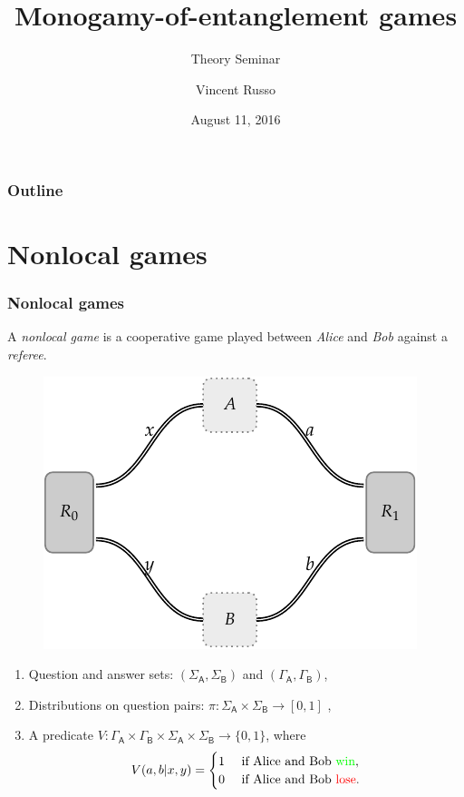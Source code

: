 \documentclass{beamer}
\title{Monogamy-of-entanglement games}
\subtitle{Theory Seminar}
\author[V. Russo]{Vincent Russo}
\institute[UWaterloo]{University of Waterloo}
\date{August 11, 2016}
\def \GammaA{\Gamma_{\reg{A}}}
\def \GammaB{\Gamma_{\reg{B}}}
\def \SigmaA{\Sigma_{\reg{A}}}
\def \SigmaB{\Sigma_{\reg{B}}}
\newcommand{\reg}[1]{\mathsf{#1}}
\begin{document}
  {%
    \frame{\titlepage}
  }

  \beamertemplatenavigationsymbolsempty

  \begin{frame}
    \frametitle{Outline}
    \tableofcontents%
  \end{frame}

  \section{Nonlocal games}

\begin{frame}
	\frametitle{Nonlocal games}
	A \emph{nonlocal game} is a cooperative game played between \emph{Alice} and \emph{Bob} against a \emph{referee}. 
	\begin{figure}[!htpb] \label{fig:nonlocal-game}
	\begin{center}
		\includegraphics[scale=0.8]{figures/two_player_game.pdf}
	\end{center}
\end{figure}
	\begin{enumerate}
		\item Question and answer sets: $(\SigmaA, \SigmaB)$ and $(\GammaA, \GammaB)$,
		\item Distributions on question pairs: $\pi: \SigmaA \times \SigmaB \rightarrow [0,1]$ ,
		\item A predicate $V : \GammaA \times \GammaB \times \SigmaA \times \SigmaB \rightarrow \{0,1\}$, where 
\[
 V(a,b|x,y) =
  \begin{cases} 
      \hfill 1 \hfill & \text{ if Alice and Bob \textcolor{green}{win}}, \\
      \hfill 0 \hfill & \text{ if Alice and Bob \textcolor{red}{lose}}. \\
  \end{cases}
\]			
	\end{enumerate}
\end{frame}
\end{document}

